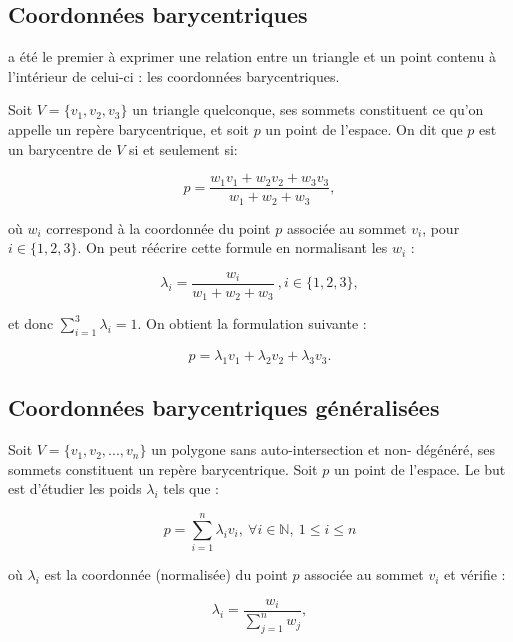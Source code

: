 \subsection{Coordonnées barycentriques}

\cite{Mob27} a été le premier à exprimer une relation entre un triangle et un
point contenu à l'intérieur de celui-ci : les
coordonnées barycentriques.

Soit $V = \{v_1, v_2, v_3\}$ un triangle quelconque, ses sommets constituent ce
qu'on appelle un repère barycentrique, et soit $p$ un point de l'espace. On dit
que $p$ est un barycentre de $V$ si et seulement si:

\begin{equation}
  p = \frac{w_1 v_1 + w_2 v_2 + w_3 v_3}{w_1+w_2+w_3},
\end{equation}

où $w_i$ correspond à la coordonnée du point $p$ associée au sommet $v_i$,
pour $i \in \{1, 2, 3\}$. On peut réécrire cette formule en normalisant les
$w_i$ :

\begin{equation}
  \lambda_i = \frac{w_i}{w_1+w_2+w_3} ~, i \in \{1, 2, 3\}, 
\end{equation}

et donc $\sum_{i=1}^3 \lambda_i = 1$. On obtient la formulation suivante :

\begin{equation}
  p = \lambda_1 v_1 + \lambda_2 v_2 + \lambda_3 v_3.
\end{equation}

\subsection{Coordonnées barycentriques généralisées}

Soit $V = \{v_1, v_2, ..., v_n\}$ un polygone sans auto-intersection et non-
dégénéré, ses sommets constituent un repère barycentrique. Soit $p$ un
point de l'espace. Le but est d'étudier les poids $\lambda_i$ tels que :

\begin{equation}
  p = \sum_{i=1}^{n} \lambda_i v_i ,
  ~ \forall i \in \mathbb{N} ,~ 1 \leq i \leq n
\end{equation}

où $\lambda_i$ est la coordonnée (normalisée) du point $p$ associée au sommet
$v_i$ et vérifie :

\begin{equation}
  \lambda_i = \frac{w_i}{\sum_{j=1}^n w_j},
\end{equation}

